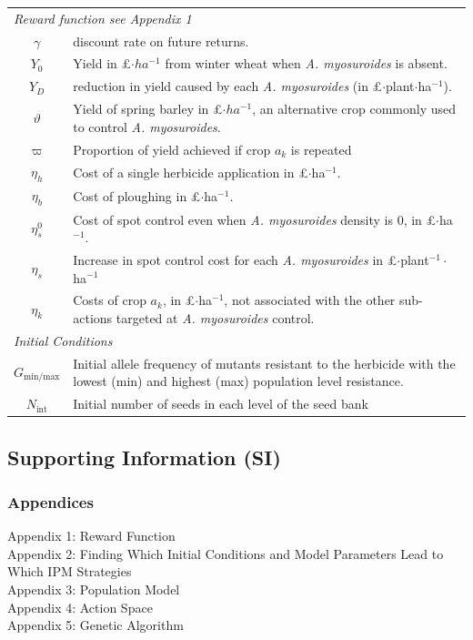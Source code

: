 \documentclass[9pt,twocolumn,twoside,lineno]{pnas-new}
\begin{document}
\begin{table}
\begin{tabular}{c p{6.5cm}}
	\multicolumn{2}{l}{\textit{Reward function see Appendix 1}}\\
	$\gamma$ & discount rate on future returns. \\
	$Y_0$ & Yield in \pounds $\cdot ha^{-1}$ from winter wheat when \textit{A. myosuroides} is absent. \\
	$Y_D$ & reduction in yield caused by each \textit{A. myosuroides} (in \pounds$\cdot$plant$\cdot$ha$^{-1}$). \\
	$\vartheta$ & Yield of spring barley in \pounds$\cdot ha^{-1}$, an alternative crop commonly used to control \textit{A. myosuroides}. \\
	 $\varpi$ & Proportion of yield achieved if crop $a_k$ is repeated \\
	 $\eta_h$ & Cost of a single herbicide application in \pounds$\cdot$ha$^{-1}$. \\
	 $\eta_b$ & Cost of ploughing in \pounds$\cdot$ha$^{-1}$. \\
	 $\eta_s^0$ & Cost of spot control even when \textit{A. myosuroides} density is 0, in \pounds$\cdot$ha$^{-1}$. \\
	 $\eta_s$ & Increase in spot control cost for each \textit{A. myosuroides} in \pounds$\cdot$plant$^{-1}\cdot$ha$^{-1}$ \\
	 $\eta_k$ & Costs of crop $a_k$, in \pounds$\cdot$ha$^{-1}$, not associated with the other sub-actions targeted at \textit{A. myosuroides} control. \\ 
	\multicolumn{2}{l}{\textit{Initial Conditions}}\\
	$G_\text{min/max}$ & Initial allele frequency of mutants resistant to the herbicide with the lowest (min) and highest (max) population level resistance. \\
	$N_\text{int}$ & Initial number of seeds in each level of the seed bank \\
\bottomrule
\end{tabular}
\end{table}

\subsection*{Supporting Information (SI)}
\subsubsection*{Appendices}
Appendix 1: Reward Function\\
Appendix 2: Finding Which Initial Conditions and Model Parameters Lead to Which IPM Strategies\\
Appendix 3: Population Model\\
Appendix 4: Action Space\\
Appendix 5: Genetic Algorithm\\
\end{document}
